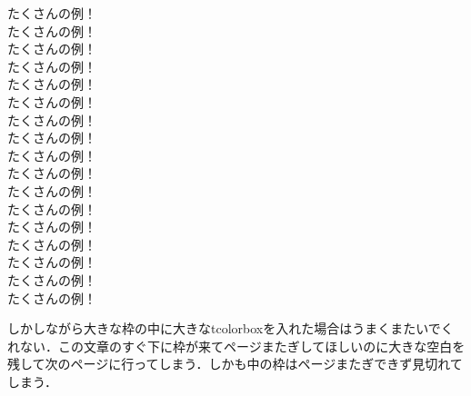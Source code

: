 \documentclass[11pt, a4paper]{ltjsarticle}
\begin{document}
\begin{statementsp}
    たくさんの例！\\ 
    たくさんの例！\\ 
    たくさんの例！\\ 
    たくさんの例！\\ 
    たくさんの例！\\ 
    たくさんの例！\\ 
    たくさんの例！\\ 
    たくさんの例！\\ 
    たくさんの例！\\ 
    たくさんの例！\\ 
    たくさんの例！\\ 
    たくさんの例！\\ 
    たくさんの例！\\ 
    たくさんの例！\\ 
    たくさんの例！\\ 
    たくさんの例！\\ 
    たくさんの例！
\end{statementsp}

しかしながら大きな枠の中に大きなtcolorboxを入れた場合はうまくまたいでくれない．この文章のすぐ下に枠が来てページまたぎしてほしいのに大きな空白を残して次のページに行ってしまう．しかも中の枠はページまたぎできず見切れてしまう．
\end{document}
